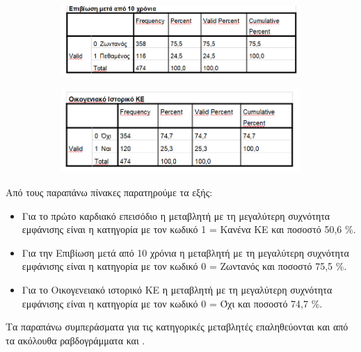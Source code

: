     \clearpage
    \begin{figure}[ht]
     \centering
     \begin{subfigure}[ht]{0.8\textwidth}
     \centering
         \includegraphics[width=\textwidth]{images/3.PNG}
              \end{subfigure}
     
     \begin{subfigure}[ht]{0.8\textwidth}
     \centering
         \includegraphics[width=\textwidth]{images/4.PNG}
             \end{subfigure}
      
\end{figure}

Από τους παραπάνω πίνακες παρατηρούμε τα εξής:
\begin{itemize}
    \item Για το πρώτο καρδιακό επεισόδιο η μεταβλητή με τη μεγαλύτερη συχνότητα εμφάνισης είναι η κατηγορία με τον κωδικό 1 = Κανένα ΚΕ και ποσοστό 50,6 \%.
    \item Για την Επιβίωση μετά από 10 χρόνια η μεταβλητή με τη μεγαλύτερη συχνότητα εμφάνισης είναι η κατηγορία με τον κωδικό 0 = Ζωντανός και ποσοστό 75,5 \%.
    \item Για το Οικογενειακό ιστορικό ΚΕ η μεταβλητή με τη μεγαλύτερη συχνότητα εμφάνισης είναι η κατηγορία με τον κωδικό 0 = Όχι και ποσοστό 74,7 \%.
    
\end{itemize}


Τα παραπάνω συμπεράσματα για τις κατηγορικές μεταβλητές επαληθεύονται και από τα ακόλουθα ραβδογράμματα και .

